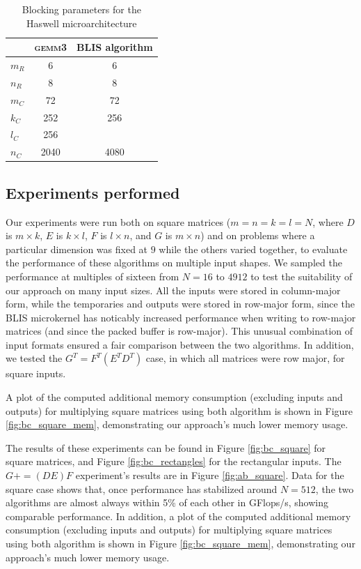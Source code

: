 \documentclass[12pt]{article}
\newcommand*{\pluseq}{\mathrel{{+}{=}}}
\newcommand*{\gemmt}{{\textsc{gemm3}}}
\begin{document}
\begin{table}
  \centering
  \begin{tabular}{l|c c}
    &\gemmt{}&BLIS algorithm\\ \hline
    $m_R$&6&6\\
    $n_R$&8&8\\
    $m_C$&72&72\\
    $k_C$&252&256\\
    $l_C$&256&\\
    $n_C$&2040&4080\\
  \end{tabular}
  \caption{Blocking parameters for the Haswell microarchitecture}
  \label{tab:parameters}
\end{table}

\subsection{Experiments performed}
Our experiments were run both on square matrices ($m = n = k = l = N$, where $D$ is $m \times k$, $E$ is $k \times l$, $F$ is $l \times n$, and $G$ is $m \times n$) and on problems where a particular dimension was fixed at $9$ while the others varied together, to evaluate the performance of these algorithms on multiple input shapes.
We sampled the performance at multiples of sixteen from $N = 16$ to $4912$ to test the suitability of our approach on many input sizes.
All the inputs were stored in column-major form, while the temporaries and outputs were stored in row-major form, since the BLIS microkernel has noticably increased performance when writing to row-major matrices (and since the packed buffer is row-major).
This unusual combination of input formats ensured a fair comparison between the two algorithms.
In addition, we tested the $G^T = F^T(E^TD^T)$ case, in which all matrices were row major, for square inputs.

A plot of the computed additional memory consumption (excluding inputs and outputs) for multiplying square matrices using both algorithm is shown in Figure \ref{fig:bc_square_mem}, demonstrating our approach's much lower memory usage.

The results of these experiments can be found in Figure \ref{fig:bc_square} for square matrices, and Figure \ref{fig:bc_rectangles} for the rectangular inputs.
The $G \pluseq (DE)F$ experiment's results are in Figure \ref{fig:ab_square}.
Data for the square case shows that, once performance has stabilized around $N = 512$, the two algorithms are almost always within 5\% of each other in GFlops/s, showing comparable performance.
In addition, a plot of the computed additional memory consumption (excluding inputs and outputs) for multiplying square matrices using both algorithm is shown in Figure \ref{fig:bc_square_mem}, demonstrating our approach's much lower memory usage.
\end{document}
